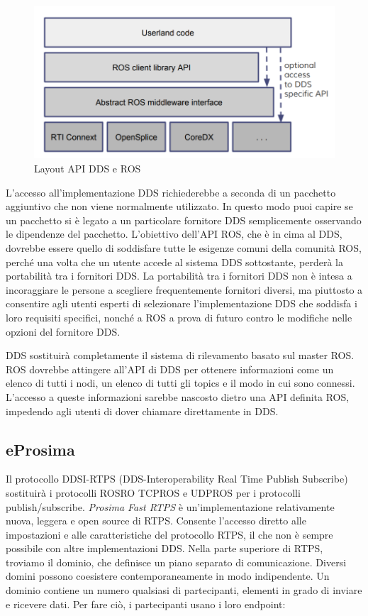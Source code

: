 \documentclass[a4paper]{article}
\begin{document}
\begin{figure}[htbp]
\centering
\includegraphics[scale=0.5]{dds_img.PNG} 
\caption{Layout API DDS e ROS}
\end{figure}


L'accesso all'implementazione DDS richiederebbe a seconda di un pacchetto aggiuntivo che non viene normalmente utilizzato. In questo modo puoi capire se un pacchetto si è legato a un particolare fornitore DDS semplicemente osservando le dipendenze del pacchetto. L'obiettivo dell'API ROS, che è in cima al DDS, dovrebbe essere quello di soddisfare tutte le esigenze comuni della comunità ROS, perché una volta che un utente accede al sistema DDS sottostante, perderà la portabilità tra i fornitori DDS. La portabilità tra i fornitori DDS non è intesa a incoraggiare le persone a scegliere frequentemente fornitori diversi, ma piuttosto a consentire agli utenti esperti di selezionare l'implementazione DDS che soddisfa i loro requisiti specifici, nonché a ROS a prova di futuro contro le modifiche nelle opzioni del fornitore DDS.

DDS sostituirà completamente il sistema di rilevamento basato sul master ROS. ROS dovrebbe attingere all'API di DDS per ottenere informazioni come un elenco di tutti i nodi, un elenco di tutti gli topics e il modo in cui sono connessi. L'accesso a queste informazioni sarebbe nascosto dietro una API definita ROS, impedendo agli utenti di dover chiamare direttamente in DDS.

\subsection{eProsima}
Il protocollo DDSI-RTPS (DDS-Interoperability Real Time Publish Subscribe) sostituirà i protocolli ROSRO TCPROS e UDPROS per i protocolli publish/subscribe.
\textit{Prosima Fast RTPS} è un'implementazione relativamente nuova, leggera e open source di RTPS. Consente l'accesso diretto alle impostazioni e alle caratteristiche del protocollo RTPS, il che non è sempre possibile con altre implementazioni DDS. 
Nella parte superiore di RTPS, troviamo il dominio, che definisce un piano separato di comunicazione. Diversi domini possono coesistere contemporaneamente in modo indipendente. Un dominio contiene un numero qualsiasi di partecipanti, elementi in grado di inviare e ricevere dati. Per fare ciò, i partecipanti usano i loro endpoint:
\end{document}
